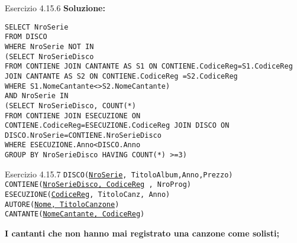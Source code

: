 \begin{frame}{Esercizio 4.15.6}
    \textbf{Soluzione:}
    \vspace{1em}
    
    \texttt{SELECT NroSerie\\FROM DISCO\\WHERE NroSerie NOT IN\\(SELECT NroSerieDisco\\FROM CONTIENE JOIN CANTANTE AS S1 ON CONTIENE.CodiceReg=S1.CodiceReg\\JOIN CANTANTE AS S2 ON CONTIENE.CodiceReg =S2.CodiceReg\\WHERE S1.NomeCantante<>S2.NomeCantante)\\AND NroSerie IN\\(SELECT NroSerieDisco, COUNT(*)\\FROM CONTIENE JOIN ESECUZIONE ON CONTIENE.CodiceReg=ESECUZIONE.CodiceReg JOIN DISCO ON
DISCO.NroSerie=CONTIENE.NroSerieDisco\\WHERE ESECUZIONE.Anno<DISCO.Anno
\\GROUP BY NroSerieDisco
HAVING COUNT(*) >=3)}
    \end{frame}
\begin{frame}{Esercizio 4.15.7}
    \texttt{DISCO(\underline{NroSerie}, TitoloAlbum,Anno,Prezzo)\\
    CONTIENE(\underline{NroSerieDisco, CodiceReg} , NroProg)\\
    ESECUZIONE(\underline{CodiceReg}, TitoloCanz, Anno)\\
    AUTORE(\underline{Nome, TitoloCanzone})\\
    CANTANTE(\underline{NomeCantante, CodiceReg})}
    \vspace{1em}
    
    \textbf{I cantanti che non hanno mai registrato una canzone come solisti;}
\end{frame}

